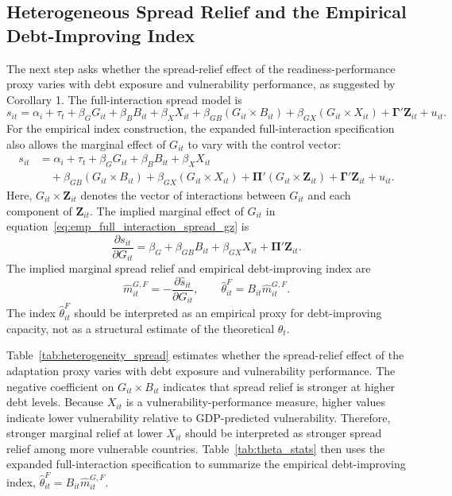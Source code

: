 \subsection{Heterogeneous Spread Relief and the Empirical Debt-Improving Index}

The next step asks whether the spread-relief effect of the readiness-performance proxy varies with debt exposure and vulnerability performance, as suggested by Corollary 1. The full-interaction spread model is
\begin{equation}
s_{it}
=
\alpha_i+\tau_t
+\beta_GG_{it}
+\beta_BB_{it}
+\beta_XX_{it}
+\beta_{GB}(G_{it}\times B_{it})
+\beta_{GX}(G_{it}\times X_{it})
+\boldsymbol{\Gamma}'\mathbf{Z}_{it}
+u_{it}.
\label{eq:emp_full_interaction_spread}
\end{equation}
For the empirical index construction, the expanded full-interaction specification also allows the marginal effect of $G_{it}$ to vary with the control vector:
\begin{equation}
\begin{aligned}
s_{it}
&=
\alpha_i+\tau_t
+\beta_GG_{it}
+\beta_BB_{it}
+\beta_XX_{it} \\
&\quad
+\beta_{GB}(G_{it}\times B_{it})
+\beta_{GX}(G_{it}\times X_{it})
+\boldsymbol{\Pi}'(G_{it}\times\mathbf{Z}_{it})
+\boldsymbol{\Gamma}'\mathbf{Z}_{it}
+u_{it}.
\end{aligned}
\label{eq:emp_full_interaction_spread_gz}
\end{equation}
Here, $G_{it}\times\mathbf{Z}_{it}$ denotes the vector of interactions between $G_{it}$ and each component of $\mathbf{Z}_{it}$. The implied marginal effect of $G_{it}$ in equation~\eqref{eq:emp_full_interaction_spread_gz} is
\begin{equation}
\frac{\partial s_{it}}{\partial G_{it}}
=
\beta_G
+\beta_{GB}B_{it}
+\beta_{GX}X_{it}
+\boldsymbol{\Pi}'\mathbf{Z}_{it}.
\label{eq:emp_marginal_spread}
\end{equation}
The implied marginal spread relief and empirical debt-improving index are
\begin{equation}
\widehat m^{G,F}_{it}
=
-
\frac{\partial \widehat s_{it}}{\partial G_{it}},
\qquad
\widehat\theta^F_{it}
=
B_{it}\widehat m^{G,F}_{it}.
\label{eq:emp_theta}
\end{equation}
The index $\widehat\theta^F_{it}$ should be interpreted as an empirical proxy for debt-improving capacity, not as a structural estimate of the theoretical $\theta_t$.

Table~\ref{tab:heterogeneity_spread} estimates whether the spread-relief effect of the adaptation proxy varies with debt exposure and vulnerability performance. The negative coefficient on $G_{it}\times B_{it}$ indicates that spread relief is stronger at higher debt levels. Because $X_{it}$ is a vulnerability-performance measure, higher values indicate lower vulnerability relative to GDP-predicted vulnerability. Therefore, stronger marginal relief at lower $X_{it}$ should be interpreted as stronger spread relief among more vulnerable countries. Table~\ref{tab:theta_stats} then uses the expanded full-interaction specification to summarize the empirical debt-improving index, $\widehat\theta^F_{it}=B_{it}\widehat m^{G,F}_{it}$.

